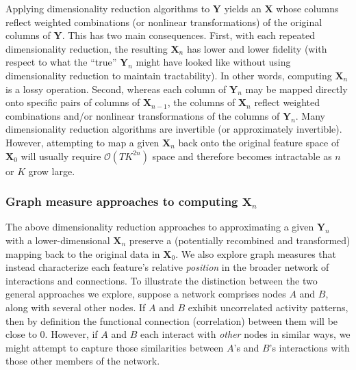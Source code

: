 \documentclass[english]{article}
\begin{document}
Applying dimensionality reduction algorithms to $\mathbf{Y}$ yields an
$\mathbf{X}$ whose columns reflect weighted combinations (or nonlinear
transformations) of the original columns of $\mathbf{Y}$.  This has
two main consequences.  First, with each repeated dimensionality
reduction, the resulting $\mathbf{X}_n$ has lower and lower fidelity
(with respect to what the ``true'' $\mathbf{Y}_n$ might have looked
like without using dimensionality reduction to maintain tractability).
In other words, computing $\mathbf{X}_n$ is a lossy operation.
Second, whereas each column of $\mathbf{Y}_n$ may be mapped
directly onto specific pairs of columns of $\mathbf{X}_{n-1}$, the
columns of $\mathbf{X}_n$ reflect weighted combinations and/or
nonlinear transformations of the columns of $\mathbf{Y}_n$.  Many
dimensionality reduction algorithms are invertible (or approximately
invertible).  However, attempting to map a given $\mathbf{X}_n$ back
onto the original feature space of $\mathbf{X}_0$ will usually require
$\mathcal{O}(TK^{2n})$ space and therefore becomes intractable
as $n$ or $K$ grow large.

\subsubsection*{Graph measure approaches to computing
  $\mathbf{X}_n$}
The above dimensionality reduction approaches to approximating a given
$\mathbf{Y}_n$ with a lower-dimensional $\mathbf{X}_n$ preserve a
(potentially recombined and transformed) mapping back to the original
data in $\mathbf{X}_0$.  We also explore graph measures that instead
characterize each feature's relative \textit{position} in the broader
network of interactions and connections.  To illustrate the
distinction between the two general approaches we explore, suppose a
network comprises nodes $A$ and $B$, along with several other nodes.  If $A$ and $B$ exhibit
uncorrelated activity patterns, then by definition the functional connection
(correlation) between them will be close to 0.
However, if $A$ and $B$ each interact with \textit{other} nodes in similar ways, we
might attempt to capture those similarities between $A$'s and $B$'s
interactions with those other members of the network.
\end{document}
